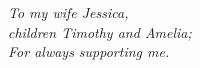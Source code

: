 \begin{dedication}
    \centering \huge \itshape{}
    To my wife Jessica, \\children Timothy and Amelia;\\
    For always supporting me.
\end{dedication}
